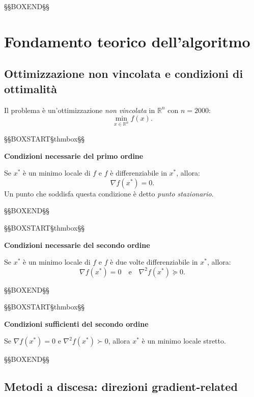 \documentclass[12pt,a4paper]{article}
\theoremstyle{definition}
\newcommand{\R}{\mathbb{R}}
\newcommand{\grad}{\nabla}
\newcommand{\Hess}{\nabla^2}
\begin{document}
\noindent §§BOXEND§§



\section{Fondamento teorico dell'algoritmo}

\subsection{Ottimizzazione non vincolata e condizioni di ottimalità}

Il problema è un'ottimizzazione \emph{non vincolata} in $\R^{n}$ con $n = 2000$:
\[
  \min_{x \in \R^n} f(x).
\]



\noindent §§BOXSTART§thmbox§§

\textbf{Condizioni necessarie del primo ordine}


Se $x^*$ è un minimo locale di $f$ e $f$ è differenziabile in $x^*$, allora:
\[
  \grad f(x^*) = 0.
\]
Un punto che soddisfa questa condizione è detto \emph{punto stazionario}.


\noindent §§BOXEND§§





\noindent §§BOXSTART§thmbox§§

\textbf{Condizioni necessarie del secondo ordine}


Se $x^*$ è un minimo locale di $f$ e $f$ è due volte differenziabile in $x^*$, allora:
\[
  \grad f(x^*) = 0 \quad \text{e} \quad \Hess f(x^*) \succeq 0.
\]


\noindent §§BOXEND§§





\noindent §§BOXSTART§thmbox§§

\textbf{Condizioni sufficienti del secondo ordine}


Se $\grad f(x^*) = 0$ e $\Hess f(x^*) \succ 0$, allora $x^*$ è un minimo locale stretto.


\noindent §§BOXEND§§



\subsection{Metodi a discesa: direzioni gradient-related}
\end{document}
